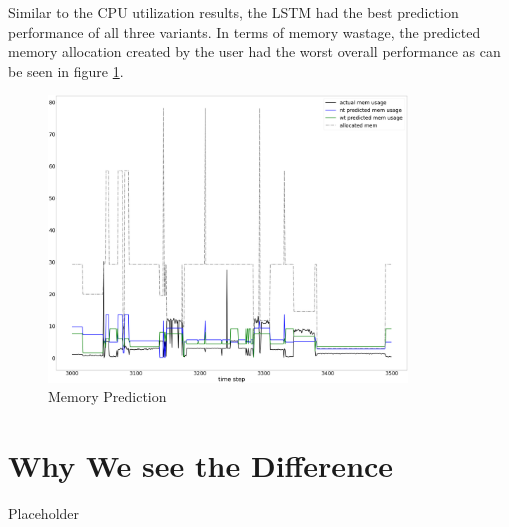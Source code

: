 \documentclass{article}
\begin{document}
    Similar to the CPU utilization results, the LSTM  had the best prediction performance of all three variants. In terms of memory wastage, the predicted memory allocation created by the user had the worst overall performance as can be seen in figure \ref{fig:mem-prediction}.
    

    \begin{figure}[!ht]
      \centering
      \includegraphics[width=0.85\textwidth]{figures/training_mem_prediction.png}
      \caption{Memory Prediction}
      \label{fig:mem-prediction}
    \end{figure}




  \section{Why We see the Difference}

\cite{blogCloudFogEdge}


    Placeholder

    \clearpage



\end{document}

